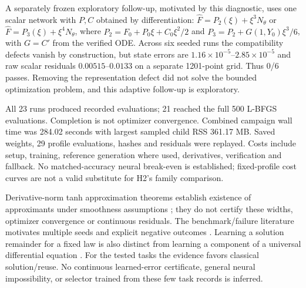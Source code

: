 A separately frozen exploratory follow-up, motivated by this diagnostic,
uses one scalar network with $P,C$ obtained by differentiation:
$\widehat F=P_2(\xi)+\xi^3N_\theta$ or
$\widehat F=P_3(\xi)+\xi^4N_\theta$, where
$P_2=F_0+P_0\xi+C_0\xi^2/2$ and
$P_3=P_2+G(1,Y_0)\xi^3/6$, with $G=C'$ from the verified ODE.
Across six seeded runs the compatibility defects vanish by construction,
but state errors are $1.16\times10^{-5}$--$2.85\times10^{-5}$ and
raw scalar residuals $0.00515$--$0.0133$ on a separate 1201-point grid.
Thus 0/6 passes. Removing the representation defect did not solve the
bounded optimization problem, and this adaptive follow-up is exploratory.

All 23 runs produced recorded evaluations; 21 reached the full 500
L-BFGS evaluations. Completion is not optimizer convergence. Combined
campaign wall time was 284.02 seconds with largest sampled child RSS
361.17 MB. Saved weights, 29 profile evaluations, hashes and residuals
were replayed. Costs include setup, training, reference generation where
used, derivatives, verification and fallback. No matched-accuracy neural
break-even is established; fixed-profile cost curves are not a valid
substitute for H2's family comparison.

Derivative-norm tanh approximation theorems establish existence of
approximants under smoothness assumptions \cite{deryck2021tanh}; they do
not certify these widths, optimizer convergence or continuous residuals.
The benchmark/failure literature motivates multiple seeds and explicit
negative outcomes \cite{pinnacle2023v2,krishnapriyan2021}. Learning a
solution remainder for a fixed law is also distinct from learning a
component of a universal differential equation \cite{rackauckas2021}.
For the tested tasks the evidence favors classical solution/reuse.
No continuous learned-error certificate, general neural impossibility,
or selector trained from these few task records is inferred.
